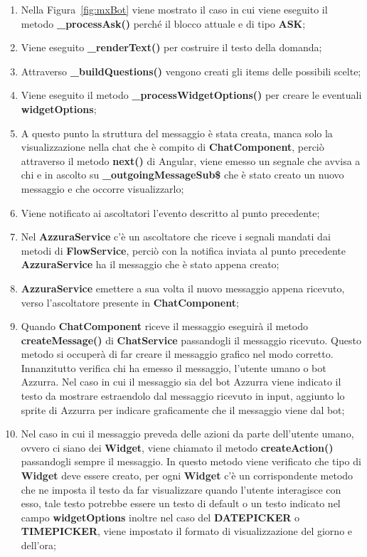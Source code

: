 \begin{enumerate}
	\item Nella Figura~\ref{fig:mxBot} viene mostrato il caso in cui viene eseguito il metodo \textbf{\_processAsk()} perché il blocco attuale e di tipo \textbf{ASK};
	\item Viene eseguito \textbf{\_renderText()} per costruire il testo della domanda;
	\item Attraverso \textbf{\_buildQuestions()} vengono creati gli items delle possibili scelte;
	\item Viene eseguito il metodo \textbf{\_processWidgetOptions()} per creare le eventuali \textbf{widgetOptions};
	\item A questo punto la struttura del messaggio è stata creata, manca solo la visualizzazione nella chat che è compito di \textbf{ChatComponent}, perciò attraverso il metodo \textbf{next()} di Angular, viene emesso un segnale che avvisa a chi e in ascolto su \textbf{\_outgoingMessageSub\$} che è stato creato un nuovo messaggio e che occorre visualizzarlo;
	\item Viene notificato ai ascoltatori l'evento descritto al punto precedente;
	\item Nel \textbf{AzzuraService} c'è un ascoltatore che riceve i segnali mandati dai metodi di \textbf{FlowService}, perciò con la notifica inviata al punto precedente \textbf{AzzuraService} ha il messaggio che è stato appena creato;
	\item \textbf{AzzuraService} emettere a sua volta il nuovo messaggio appena ricevuto, verso l'ascoltatore presente in \textbf{ChatComponent};
	\item Quando \textbf{ChatComponent} riceve il messaggio eseguirà il metodo \textbf{createMessage()} di \textbf{ChatService} passandogli il messaggio ricevuto. Questo metodo si occuperà di far creare il messaggio grafico nel modo corretto.
	Innanzitutto verifica chi ha emesso il messaggio, l'utente umano o bot Azzurra. Nel caso in cui il messaggio sia del bot Azzurra viene indicato il testo da mostrare estraendolo dal messaggio ricevuto in input, aggiunto lo sprite di Azzurra per indicare graficamente che il messaggio viene dal bot;
	\item Nel caso in cui il messaggio preveda delle azioni da parte dell'utente umano, ovvero ci siano dei \textbf{Widget}, viene chiamato il metodo \textbf{createAction()} passandogli sempre il messaggio. In questo metodo viene verificato che tipo di \textbf{Widget} deve essere creato, per ogni \textbf{Widget} c'è un corrispondente metodo che ne imposta il testo da far visualizzare quando l'utente interagisce con esso, tale testo potrebbe essere un testo di default o un testo indicato nel campo \textbf{widgetOptions} inoltre nel caso del \textbf{DATEPICKER} o \textbf{TIMEPICKER}, viene impostato il formato di visualizzazione del giorno e dell'ora;

\end{enumerate}
